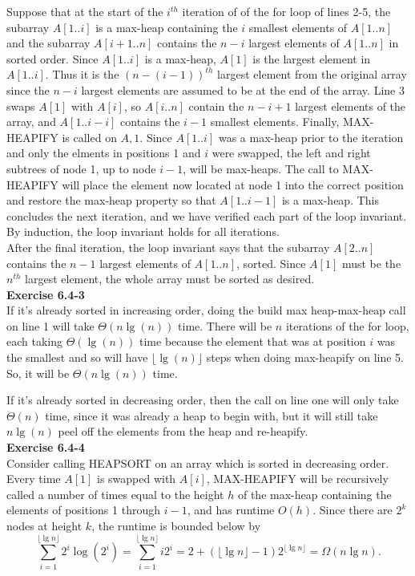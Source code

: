 \documentclass{article}
\begin{document}
Suppose that at the start of the $i^{th}$ iteration of of the for loop of lines 2-5, the subarray $A[1..i]$ is a max-heap containing the $i$ smallest elements of $A[1..n]$ and the subarray $A[i+1..n]$ contains the $n-i$ largest elements of $A[1..n]$ in sorted order. Since $A[1..i]$ is a max-heap, $A[1]$ is the largest element in $A[1..i]$. Thus it is the $(n-(i-1))^{th}$ largest element from the original array since the $n-i$ largest elements are assumed to be at the end of the array.  Line 3 swaps $A[1]$ with $A[i]$, so $A[i..n]$ contain the $n-i+1$ largest elements of the array, and $A[1..i-i]$ contains the $i-1$ smallest elements.  Finally, MAX-HEAPIFY is called on $A,1$.  Since $A[1..i]$ was a max-heap prior to the iteration and only the elments in positions 1 and $i$ were swapped, the left and right subtrees of node 1, up to node $i-1$, will be max-heaps.  The call to MAX-HEAPIFY will place the element now located at node 1 into the correct position and restore the max-heap property so that $A[1..i-1]$ is a max-heap.  This concludes the next iteration, and we have verified each part of the loop invariant.  By induction, the loop invariant holds for all iterations.\\

After the final iteration, the loop invariant says that the subarray $A[2..n]$ contains the $n-1$ largest elements of $A[1..n]$, sorted.  Since $A[1]$ must be the $n^{th}$ largest element, the whole array must be sorted as desired. \\

\noindent\textbf{Exercise 6.4-3}\\

If it's already sorted in increasing order, doing the build max heap-max-heap call on line 1 will take $\Theta(n\lg(n))$ time. There will be $n$ iterations of the for loop, each taking $\Theta(\lg(n))$ time because the element that was at position $i$ was the smallest and so will have $\lfloor \lg(n)\rfloor$ steps when doing max-heapify on line 5. So, it will be $\Theta(n\lg(n))$ time.

If it's already sorted in decreasing order, then the call on line one will only take $\Theta(n)$ time, since it was already a heap to begin with, but it will still take $n\lg(n)$ peel off the elements from the heap and re-heapify. \\

\noindent\textbf{Exercise 6.4-4}\\

Consider calling HEAPSORT on an array which is sorted in decreasing order.  Every time $A[1]$ is swapped with $A[i]$, MAX-HEAPIFY will be recursively called a number of times equal to the height $h$ of the max-heap containing the elements of positions 1 through $i-1$, and has runtime $O(h)$.  Since there are $2^k$ nodes at height $k$, the runtime is bounded below by
\[ \sum_{i=1}^{\lfloor\lg n\rfloor} 2^i \log(2^i) =  \sum_{i=1}^{\lfloor\lg n\rfloor} i2^i = 2 + (\lfloor\lg n\rfloor - 1)2^{\lfloor\lg n\rfloor} = \Omega(n\lg n).\]
\end{document}
